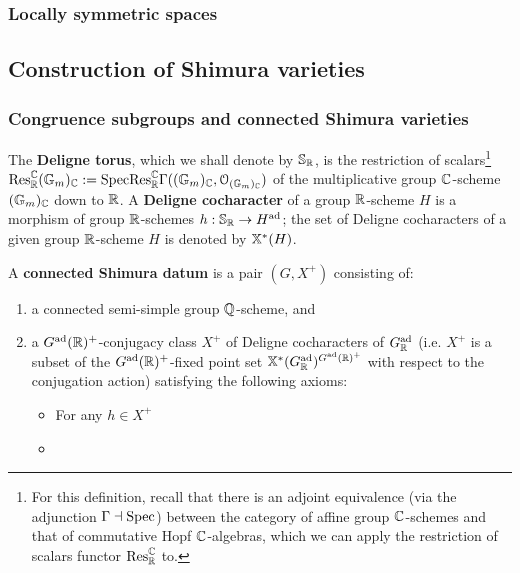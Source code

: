         \subsubsection{Locally symmetric spaces}
            
    \subsection{Construction of Shimura varieties}    
        \subsubsection{Congruence subgroups and connected Shimura varieties}
            \begin{definition} \label{def: the_deligne_torus}
                The \textbf{Deligne torus}, which we shall denote by $\mathbb{S}_{\mathbb{R}}$, is the restriction of scalars\footnote{For this definition, recall that there is an adjoint equivalence (via the adjunction $\Gamma \dashv \mathrm{Spec}$) between the category of affine group $\mathbb{C}$-schemes and that of commutative Hopf $\mathbb{C}$-algebras, which we can apply the restriction of scalars functor $\mathrm{Res}^{\mathbb{C}}_{\mathbb{R}}$ to.} $\mathrm{Res}^{\mathbb{C}}_{\mathbb{R}} (\mathbb{G}_m)_{\mathbb{C}} := \mathrm{Spec} \mathrm{Res}^{\mathbb{C}}_{\mathbb{R}} \Gamma((\mathbb{G}_m)_{\mathbb{C}}, \mathcal{O}_{(\mathbb{G}_m)_{\mathbb{C}}})$ of the multiplicative group $\mathbb{C}$-scheme $(\mathbb{G}_m)_{\mathbb{C}}$ down to $\mathbb{R}$. A \textbf{Deligne cocharacter} of a group $\mathbb{R}$-scheme $H$ is a morphism of group $\mathbb{R}$-schemes $h: \mathbb{S}_{\mathbb{R}} \to H^{\mathrm{ad}}$; the set of Deligne cocharacters of a given group $\mathbb{R}$-scheme $H$ is denoted by $\mathbb{X}^*(H)$.
            \end{definition}
            \begin{definition} \label{def: connected_shimura_data}
                A \textbf{connected Shimura datum} is a pair $(G, X^+)$ consisting of:
                    \begin{enumerate}
                        \item a connected semi-simple group $\mathbb{Q}$-scheme, and
                        \item a $G^{\mathrm{ad}}(\mathbb{R})^+$-conjugacy class $X^+$ of Deligne cocharacters of $G^{\mathrm{ad}}_{\mathbb{R}}$ (i.e. $X^+$ is a subset of the $G^{\mathrm{ad}}(\mathbb{R})^+$-fixed point set $\mathbb{X}^*(G^{\mathrm{ad}}_{\mathbb{R}})^{G^{\mathrm{ad}}(\mathbb{R})^+}$ with respect to the conjugation action) satisfying the following axioms:
                            \begin{itemize}
                                \item For any $h \in X^+$ 
                                \item 
                            \end{itemize}
                    \end{enumerate}
            \end{definition}
